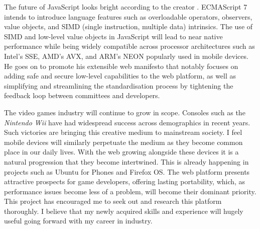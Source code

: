 \documentclass[final]{cmpreport}
\begin{document}
The future of JavaScript looks bright according to the creator \citet{Eich}. ECMAScript 7 intends to introduce language features such as overloadable operators, observers, value objects, and SIMD (single instruction, multiple data) intrinsics. The use of SIMD and low-level value objects in JavaScript will lead to near native performance while being widely compatible across processor architectures such as Intel's SSE, AMD's AVX, and ARM's NEON popularly used in mobile devices. He goes on to promote his extensible web manifesto \footnotemark that notably focuses on adding safe and secure low-level capabilities to the web platform, as well as simplifying and streamlining the standardisation process by tightening the feedback loop between committees and developers.


The video games industry will continue to grow in scope. Consoles such as the \textit{Nintendo Wii} have had widespread success across demographics in recent years. Such victories are bringing this creative medium to mainstream society. I feel mobile devices will similarly perpetuate the medium as they become common place in our daily lives. With the web growing alongside these devices it is a natural progression that they become intertwined. This is already happening in projects such as Ubuntu for Phones and Firefox OS. The web platform presents attractive prospects for game developers, offering lasting portability, which, as performance issues become less of a problem, will become their dominant priority. This project has encouraged me to seek out and research this platform thoroughly. I believe that my newly acquired skills and experience will hugely useful going forward with my career in industry.

\clearpage

\end{document}
